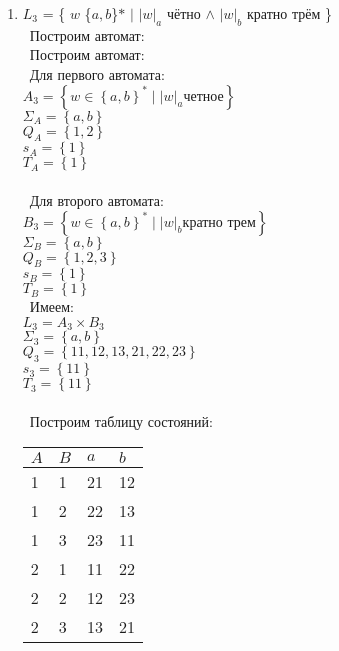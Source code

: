 \documentclass{article}
\begin{document}
\begin{enumerate}
\item {$L_3$ = \{ $w$ \in \{$a,b$\}$*$ $|$  $ {|w|_a}$ чётно  $\wedge$ ${|w|_b}$ кратно трём \} }\\
\ Построим автомат: \\
\ Построим автомат: \\
\ Для первого автомата: \\
$ A_{3} = \left\{ w \in \left\{ a, b \right\}^{*} \mid \left| w \right|_{a} \text{четное} \right\} $ \\
$ \Sigma_{A} = \left\{ a, b \right\}$ \\
$ Q_{A} = \left\{ 1, 2 \right\} $ \\
$ s_{A} = \left\{ 1 \right\} $ \\
$ T_{A} = \left\{ 1 \right\}$ \\
\\
\ Для второго автомата: \\
$ B_{3} = \left\{ w \in \left\{ a, b \right\}^{*} \mid  \left| w \right|_{b} \text{кратно трем} \right\} $ \\
$ \Sigma_{B} = \left\{ a, b \right\}$ \\
$ Q_{B} = \left\{ 1, 2, 3 \right\} $ \\
$ s_{B} = \left\{ 1 \right\} $ \\
$ T_{B} = \left\{ 1 \right\}$ \\
\ Имеем: \\
$L_{3} = A_{3} \times B_{3}$ \\
$ \Sigma_{3} = \left\{ a, b \right\}$ \\
$ Q_{3} = \left\{ 11, 12, 13, 21, 22, 23 \right\}$ \\
$ s_{3} = \left\{ 11 \right\}$ \\
$ T_{3} = \left\{ 11 \right\}$ \\
\\ \ Построим таблицу состояний: \\
\begin{table}[!htbp]
\centering
\begin{tabular}{|l|l|l|l|}
\hline
$A$ & $B$ & $a$ & $b$ \\ \hline
1   & 1   & 21  & 12  \\ \hline
1   & 2   & 22  & 13  \\ \hline
1   & 3   & 23  & 11  \\ \hline
2   & 1   & 11  & 22  \\ \hline
2   & 2   & 12  & 23  \\ \hline
2   & 3   & 13  & 21  \\ \hline
\end{tabular}
\end{table}


\end{enumerate}
\end{document}
